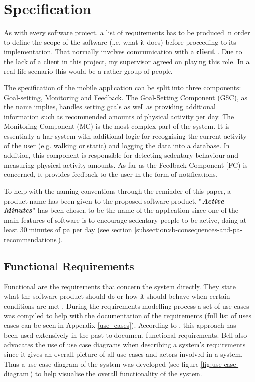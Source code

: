 \chapter{Specification}
\label{Chapter:Specification}

As with every software project, a list of requirements has to be produced in order to define the scope of the software (i.e. what it does) before proceeding to its implementation. That normally involves communication with a \textbf{client} \citep[23]{bell2005}. Due to the lack of a client in this project, my supervisor agreed on playing this role. In a real life scenario this would be a rather group of people.

The specification of the mobile application can be split into three components: Goal-setting, Monitoring and Feedback. The Goal-Setting Component (GSC), as the name implies, handles setting goals as well as providing additional information such as recommended amounts of physical activity per day. The Monitoring Component (MC) is the most complex part of the system. It is essentially a \gls{har} system with additional logic for recognising the current activity of the user (e.g. walking or static) and logging the data into a database. In addition, this component is responsible for detecting sedentary behaviour and measuring physical activity amounts. As far as the Feedback Component (FC) is concerned, it provides feedback to the user in the form of notifications.

To help with the naming conventions through the reminder of this paper, a product name has been given to the proposed software product. \textbf{"\textit{Active Minutes}"} has been chosen to be the name of the application since one of the main features of software is to encourage sedentary people to be active, doing at least 30 minutes of \gls{pa} per day (see section \ref{subsection:sb-consequences-and-pa-recommendations}).

\section{Functional Requirements}
    Functional are the requirements that concern the system directly. They state what the software product should do or how it should behave when certain conditions are met \citep[84]{sommerville2010}. During the requirements modelling process a set of use cases was compiled to help with the documentation of the requirements (full list of uses cases can be seen in Appendix \ref{use_cases}). According to \citet[45-47]{bell2005}, this approach has been used extensively in the past to document functional requirements. Bell also advocates the use of use case diagrams when describing a system's requirements since it gives an overall picture of all use cases and actors involved in a system. Thus a use case diagram of the system was developed (see figure \ref{fig:use-case-diagram}) to help visualise the overall functionality of the system.
    
